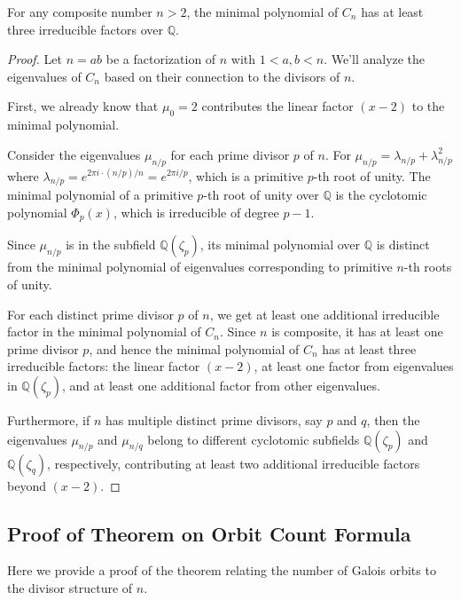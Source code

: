 \begin{proposition}
For any composite number $n > 2$, the minimal polynomial of $C_n$ has at least three irreducible factors over $\mathbb{Q}$.
\end{proposition}

\begin{proof}
Let $n = ab$ be a factorization of $n$ with $1 < a, b < n$. We'll analyze the eigenvalues of $C_n$ based on their connection to the divisors of $n$.

First, we already know that $\mu_0 = 2$ contributes the linear factor $(x-2)$ to the minimal polynomial.

Consider the eigenvalues $\mu_{n/p}$ for each prime divisor $p$ of $n$. For $\mu_{n/p} = \lambda_{n/p} + \lambda_{n/p}^2$ where $\lambda_{n/p} = e^{2\pi i \cdot (n/p)/n} = e^{2\pi i/p}$, which is a primitive $p$-th root of unity. The minimal polynomial of a primitive $p$-th root of unity over $\mathbb{Q}$ is the cyclotomic polynomial $\Phi_p(x)$, which is irreducible of degree $p-1$.

Since $\mu_{n/p}$ is in the subfield $\mathbb{Q}(\zeta_p)$, its minimal polynomial over $\mathbb{Q}$ is distinct from the minimal polynomial of eigenvalues corresponding to primitive $n$-th roots of unity. 

For each distinct prime divisor $p$ of $n$, we get at least one additional irreducible factor in the minimal polynomial of $C_n$. Since $n$ is composite, it has at least one prime divisor $p$, and hence the minimal polynomial of $C_n$ has at least three irreducible factors: the linear factor $(x-2)$, at least one factor from eigenvalues in $\mathbb{Q}(\zeta_p)$, and at least one additional factor from other eigenvalues.

Furthermore, if $n$ has multiple distinct prime divisors, say $p$ and $q$, then the eigenvalues $\mu_{n/p}$ and $\mu_{n/q}$ belong to different cyclotomic subfields $\mathbb{Q}(\zeta_p)$ and $\mathbb{Q}(\zeta_q)$, respectively, contributing at least two additional irreducible factors beyond $(x-2)$.
\end{proof}

\subsection{Proof of Theorem on Orbit Count Formula}

Here we provide a proof of the theorem relating the number of Galois orbits to the divisor structure of $n$.

